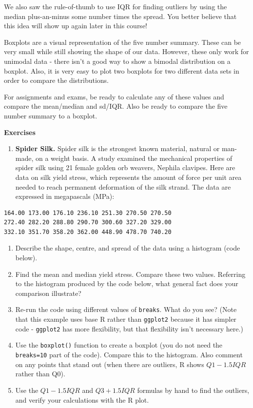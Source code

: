 \documentclass[
  letterpaper,
  DIV=11,
  numbers=noendperiod,
  oneside]{scrreprt}
\providecommand{\tightlist}{%
  \setlength{\itemsep}{0pt}\setlength{\parskip}{0pt}}\usepackage{longtable,booktabs,array}
\begin{document}
We also saw the rule-of-thumb to use IQR for finding outliers by using
the median plus-an-minus some number times the spread. You better
believe that this idea will show up again later in this course!

Boxplots are a visual representation of the five number summary. These
can be very small while still showing the shape of our data. However,
these only work for unimodal data - there isn't a good way to show a
bimodal distribution on a boxplot. Also, it is very easy to plot two
boxplots for two different data sets in order to compare the
distributions.

For assignments and exams, be ready to calculate any of these values and
compare the mean/median and sd/IQR. Also be ready to compare the five
number summary to a boxplot.

\textbf{Exercises}

\begin{enumerate}
\def\labelenumi{\arabic{enumi}.}
\tightlist
\item
  \textbf{Spider Silk.} Spider silk is the strongest known material,
  natural or man-made, on a weight basis. A study examined the
  mechanical properties of spider silk using 21 female golden orb
  weavers, Nephila clavipes. Here are data on silk yield stress, which
  represents the amount of force per unit area needed to reach permanent
  deformation of the silk strand. The data are expressed in megapascals
  (MPa):
\end{enumerate}

\begin{verbatim}
164.00 173.00 176.10 236.10 251.30 270.50 270.50
272.40 282.20 288.80 290.70 300.60 327.20 329.00
332.10 351.70 358.20 362.00 448.90 478.70 740.20
\end{verbatim}

\begin{enumerate}
\def\labelenumi{\alph{enumi}.}
\tightlist
\item
  Describe the shape, centre, and spread of the data using a histogram
  (code below).
\item
  Find the mean and median yield stress. Compare these two values.
  Referring to the histogram produced by the code below, what general
  fact does your comparison illustrate?
\item
  Re-run the code using different values of \texttt{breaks}. What do you
  see? (Note that this example uses base R rather than \texttt{ggplot2}
  because it has simpler code - \texttt{ggplot2} has more flexibility,
  but that flexibility isn't necessary here.)
\item
  Use the \texttt{boxplot()} function to create a boxplot (you do not
  need the \texttt{breaks=10} part of the code). Compare this to the
  histogram. Also comment on any points that stand out (when there are
  outliers, R shows \(Q1 - 1.5IQR\) rather than Q0).
\item
  Use the \(Q1 - 1.5IQR\) and \(Q3 + 1.5 IQR\) formulas by hand to find
  the outliers, and verify your calculations with the R plot.
\end{enumerate}
\end{document}
